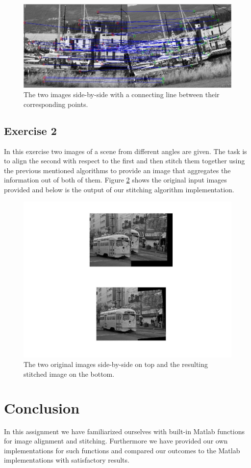 \documentclass[11pt]{article}
\begin{document}
\begin{figure}[h!]
\begin{flushleft}
\includegraphics[scale=0.7]{side_by_side.jpg}
\caption{The two images side-by-side with a connecting line between their corresponding points.}
\label{side_by_side}
\end{flushleft}
\end{figure}

\subsection{Exercise 2}
In this exercise two images of a scene from different angles are given. The task is to align the second with respect to the first and then stitch them together using the previous mentioned algorithms to provide an image that aggregates the information out of both of them. Figure \ref{stitched} shows the original input images provided and below is the output of our stitching algorithm implementation.

\begin{figure}[h!]
\begin{flushleft}
\includegraphics[scale=0.4]{stich.jpg}
\caption{The two original images side-by-side on top and the resulting stitched image on the bottom.}
\label{stitched}
\end{flushleft}
\end{figure}

\section{Conclusion}
In this assignment we have familiarized ourselves with built-in Matlab functions for image alignment and stitching. Furthermore we have provided our own implementations for such functions and compared our outcomes to the Matlab implementations with satisfactory results.
\end{document}
